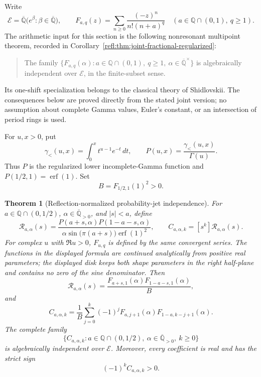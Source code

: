 \documentclass[11pt,a4paper]{article}
\newcommand{\Qbar}{\overline{\mathbb Q}}
\newcommand{\E}{\mathcal E}
\newtheorem{theorem}{Theorem}[section]
\theoremstyle{definition}
\theoremstyle{remark}
\numberwithin{equation}{section}
\begin{document}
Write
\[
 \E=\Qbar
   \bigl(e^\beta:\beta\in\Qbar\bigr),\qquad
 F_{a,q}(z)=\sum_{n\geq0}\frac{(-z)^n}{n!(n+a)^q}
 \quad(a\in\mathbb Q\cap(0,1),\ q\geq1).
\]
The arithmetic input for this section is the following nonresonant
multipoint theorem, recorded in Corollary~\ref{refl:thm:joint-fractional-regularized}:
\begin{quote}
The family
\(\{F_{a,q}(\alpha):a\in\mathbb Q\cap(0,1),\ q\geq1,
\ \alpha\in\Qbar^{\times}\}\)
is algebraically independent over \(\E\), in the
finite-subset sense.
\end{quote}
Its one-shift specialization belongs to the classical theory of
Shidlovskii. The consequences below are proved directly from the stated
joint version; no assumption about complete Gamma values, Euler's
constant, or an intersection of period rings is used.

For \(u,x>0\), put
\[
 \gamma_{<}(u,x)=\int_0^x t^{u-1}e^{-t}\,dt,
 \qquad P(u,x)=\frac{\gamma_{<}(u,x)}{\Gamma(u)}.
\]
Thus \(P\) is the regularized lower incomplete-Gamma function and
\(P(1/2,1)=\operatorname{erf}(1)\). Set
\[
 B=F_{1/2,1}(1)^2>0.
\]

\begin{theorem}[Reflection-normalized probability-jet independence]\label{refl:thm:reflection}
For \(a\in\mathbb Q\cap(0,1/2)\),
\(\alpha\in\Qbar_{>0}\), and \(|s|<a\), define
\begin{equation}\label{refl:eq:reflection-probability-function}
 \mathcal R_{a,\alpha}(s)=
 \frac{P(a+s,\alpha)P(1-a-s,\alpha)}
 {\alpha\sin\!\bigl(\pi(a+s)\bigr)\operatorname{erf}(1)^2},
 \qquad
 C_{a,\alpha,k}=[s^k]\mathcal R_{a,\alpha}(s).
\end{equation}
For complex $u$ with $\Re u>0$, $F_{u,q}$ is defined by the same
convergent series. The functions in the displayed formula are continued
analytically from positive real parameters; the displayed disk keeps both shape
parameters in the right half-plane and contains no zero of the sine
denominator. Then
\begin{equation}\label{refl:eq:reflection-exact-cancellation}
 \mathcal R_{a,\alpha}(s)
 =\frac{F_{a+s,1}(\alpha)F_{1-a-s,1}(\alpha)}{B},
\end{equation}
and
\begin{equation}\label{refl:eq:reflection-jet-formula}
 C_{a,\alpha,k}=
 \frac1B\sum_{j=0}^k(-1)^j
 F_{a,j+1}(\alpha)F_{1-a,k-j+1}(\alpha).
\end{equation}
The complete family
\[
 \bigl\{C_{a,\alpha,k}:
 a\in\mathbb Q\cap(0,1/2),\
 \alpha\in\Qbar_{>0},\ k\geq0\bigr\}
\]
is algebraically independent over \(\E\).
Moreover, every coefficient is real and has the strict sign
\begin{equation}\label{refl:eq:reflection-coefficient-signs}
 (-1)^k C_{a,\alpha,k}>0.
\end{equation}
\end{theorem}
\end{document}
